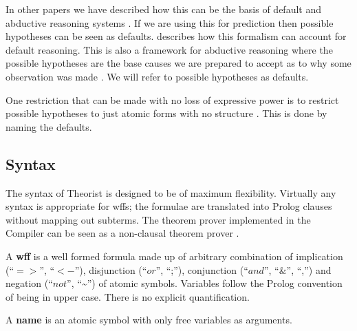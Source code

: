 In other papers we have described how this can be the basis of default
and abductive reasoning systems
\cite{pga,poole:lf,poole:ep,poole:meth}.  If we are using this for
prediction then possible hypotheses can be seen as defaults.
\cite{poole:lf} describes how this formalism can account for default
reasoning. This is also a framework for abductive reasoning where the
possible hypotheses are the base causes we are prepared to accept as
to why some observation was made \cite{pga,poole:ep,poole:meth}.  We
will refer to possible hypotheses as defaults.

One restriction that can be made with no loss of expressive power
is to restrict possible hypotheses to just atomic forms with no
structure \cite{poole:lf}. This is done by naming the defaults.
\subsection{Syntax} \label{syntax}
The syntax of Theorist is designed to be of maximum flexibility.
Virtually any syntax is appropriate for wffs; the formulae are
translated into Prolog clauses without mapping out subterms. The
theorem prover implemented in the Compiler can be seen as a
non-clausal theorem prover \cite{poole:clausal}.

A {\bf wff\/} is a well formed formula made up of arbitrary
combination of implication (``$=>$'', ``$<-$''), disjunction
(``$or$'', ``;''), conjunction (``$and$'', ``$\&$'', ``,'') and
negation (``$not$'', ``\~{}'') of atomic symbols. Variables follow the
Prolog convention of being in upper case. There is no explicit
quantification.

A {\bf name\/} is an atomic symbol with only free variables as arguments.

